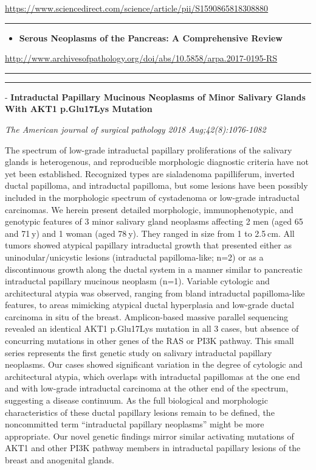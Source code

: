 \documentclass[]{article}
\providecommand{\tightlist}{%
  \setlength{\itemsep}{0pt}\setlength{\parskip}{0pt}}
\begin{document}
\url{https://www.sciencedirect.com/science/article/pii/S1590865818308880}

\begin{center}\rule{0.5\linewidth}{\linethickness}\end{center}

\begin{itemize}
\tightlist
\item
  \textbf{Serous Neoplasms of the Pancreas: A Comprehensive Review}
\end{itemize}

\url{http://www.archivesofpathology.org/doi/abs/10.5858/arpa.2017-0195-RS}

\begin{center}\rule{0.5\linewidth}{\linethickness}\end{center}

\begin{center}\rule{0.5\linewidth}{\linethickness}\end{center}

 - \textbf{Intraductal Papillary Mucinous Neoplasms of Minor Salivary
Glands With AKT1 p.Glu17Lys Mutation}

\emph{The American journal of surgical pathology 2018
Aug;42(8):1076-1082}

The spectrum of low-grade intraductal papillary proliferations of the
salivary glands is heterogenous, and reproducible morphologic diagnostic
criteria have not yet been established. Recognized types are sialadenoma
papilliferum, inverted ductal papilloma, and intraductal papilloma, but
some lesions have been possibly included in the morphologic spectrum of
cystadenoma or low-grade intraductal carcinomas. We herein present
detailed morphologic, immunophenotypic, and genotypic features of 3
minor salivary gland neoplasms affecting 2 men (aged 65 and 71 y) and 1
woman (aged 78 y). They ranged in size from 1 to 2.5 cm. All tumors
showed atypical papillary intraductal growth that presented either as
uninodular/unicystic lesions (intraductal papilloma-like; n=2) or as a
discontinuous growth along the ductal system in a manner similar to
pancreatic intraductal papillary mucinous neoplasm (n=1). Variable
cytologic and architectural atypia was observed, ranging from bland
intraductal papilloma-like features, to areas mimicking atypical ductal
hyperplasia and low-grade ductal carcinoma in situ of the breast.
Amplicon-based massive parallel sequencing revealed an identical AKT1
p.Glu17Lys mutation in all 3 cases, but absence of concurring mutations
in other genes of the RAS or PI3K pathway. This small series represents
the first genetic study on salivary intraductal papillary neoplasms. Our
cases showed significant variation in the degree of cytologic and
architectural atypia, which overlaps with intraductal papillomas at the
one end and with low-grade intraductal carcinoma at the other end of the
spectrum, suggesting a disease continuum. As the full biological and
morphologic characteristics of these ductal papillary lesions remain to
be defined, the noncommitted term ``intraductal papillary neoplasms''
might be more appropriate. Our novel genetic findings mirror similar
activating mutations of AKT1 and other PI3K pathway members in
intraductal papillary lesions of the breast and anogenital glands.
\end{document}
